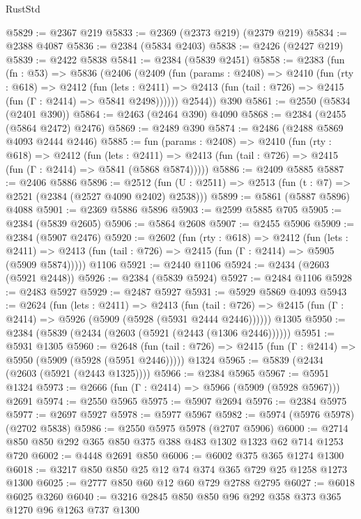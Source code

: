 \begin{lexlean}{RustStd}
\begin{coremodule}
@5829 := @2367 @219
@5833 := @2369 (@2373 @219) (@2379 @219)
@5834 := @2388 @4087
@5836 := @2384 (@5834 @2403)
@5838 := @2426 (@2427 @219)
@5839 := @2422 @5838
@5841 := @2384 (@5839 @2451)
@5858 := @2383
    (fun (fn : @53) =>
    @5836
      (@2406
        (@2409
          (fun (params : @2408) =>
          @2410
            (fun (rty : @618) =>
            @2412
              (fun (lets : @2411) =>
              @2413 (fun (tail : @726) => @2415 (fun (Γ : @2414) => @5841 @2498))))))
        @2544))
    @390
@5861 := @2550 (@5834 (@2401 @390))
@5864 := @2463 (@2464 @390) @4090
@5868 := @2384 (@2455 (@5864 @2472) @2476)
@5869 := @2489 @390
@5874 := @2486 (@2488 @5869 @4093 @2444 @2446)
@5885 := fun (params : @2408) =>
  @2410
    (fun (rty : @618) =>
    @2412
      (fun (lets : @2411) =>
      @2413 (fun (tail : @726) => @2415 (fun (Γ : @2414) => @5841 (@5868 @5874)))))
@5886 := @2409 @5885
@5887 := @2406 @5886
@5896 := @2512 (fun (U : @2511) => @2513 (fun (t : @7) => @2521 (@2384 (@2527 @4090 @2402) @2538)))
@5899 := @5861 (@5887 @5896) @4088
@5901 := @2369 @5886 @5896
@5903 := @2599 @5885 @705
@5905 := @2384 (@5839 @2605)
@5906 := @5864 @2608
@5907 := @2455 @5906
@5909 := @2384 (@5907 @2476)
@5920 := @2602
    (fun (rty : @618) =>
    @2412
      (fun (lets : @2411) =>
      @2413 (fun (tail : @726) => @2415 (fun (Γ : @2414) => @5905 (@5909 @5874)))))
    @1106
@5921 := @2440 @1106
@5924 := @2434 (@2603 (@5921 @2448))
@5926 := @2384 (@5839 @5924)
@5927 := @2484 @1106
@5928 := @2483 @5927
@5929 := @2487 @5927
@5931 := @5929 @5869 @4093
@5943 := @2624
    (fun (lets : @2411) =>
    @2413
      (fun (tail : @726) => @2415 (fun (Γ : @2414) => @5926 (@5909 (@5928 (@5931 @2444 @2446))))))
    @1305
@5950 := @2384 (@5839 (@2434 (@2603 (@5921 (@2443 (@1306 @2446))))))
@5951 := @5931 @1305
@5960 := @2648
    (fun (tail : @726) => @2415 (fun (Γ : @2414) => @5950 (@5909 (@5928 (@5951 @2446)))))
    @1324
@5965 := @5839 (@2434 (@2603 (@5921 (@2443 @1325))))
@5966 := @2384 @5965
@5967 := @5951 @1324
@5973 := @2666 (fun (Γ : @2414) => @5966 (@5909 (@5928 @5967))) @2691
@5974 := @2550 @5965
@5975 := @5907 @2694
@5976 := @2384 @5975
@5977 := @2697 @5927
@5978 := @5977 @5967
@5982 := @5974 (@5976 @5978) (@2702 @5838)
@5986 := @2550 @5975 @5978 (@2707 @5906)
@6000 := @2714 @850 @850 @292 @365 @850 @375 @388 @483 @1302 @1323 @62 @714 @1253 @720
@6002 := @4448 @2691 @850
@6006 := @6002 @375 @365 @1274 @1300
@6018 := @3217 @850 @850 @25 @12 @74 @374 @365 @729 @25 @1258 @1273 @1300
@6025 := @2777 @850 @60 @12 @60 @729 @2788 @2795
@6027 := @6018 @6025 @3260
@6040 := @3216 @2845 @850 @850 @96 @292 @358 @373 @365 @1270 @96 @1263 @737 @1300

\end{coremodule}
\end{lexlean}
